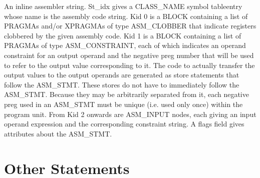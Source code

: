 \documentclass{article}
\begin{document}
\begin{itemize}
An inline assembler string. St\_idx gives a CLASS\_NAME symbol
tableentry whose name is the assembly code string. Kid 0 is a
BLOCK containing a list of PRAGMAs and/or XPRAGMAs of type
ASM\_CLOBBER that indicate registers clobbered by the given assembly
code. Kid 1 is a
BLOCK containing a list of PRAGMAs of type ASM\_CONSTRAINT, each of
which indicates an operand constraint for an output operand and
the negative preg number that will be used to refer to the output
value corresponding to it. The code to actually transfer the output
values to the output operands are generated as store statements
that follow the ASM\_STMT. These stores do not have to immediately
follow the ASM\_STMT. Because they may be arbitrarily separated from
it, each negative preg used in an
ASM\_STMT must be unique (i.e. used only once)
within the program unit. From Kid 2 onwards are ASM\_INPUT
nodes, each giving an input operand expression and the corresponding
constraint string. A flags field gives attributes about the ASM\_STMT.

\end{itemize}
\section{Other Statements}
\end{document}
